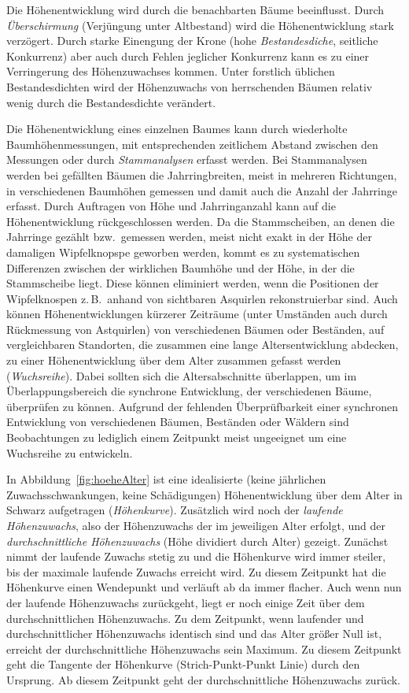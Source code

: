\documentclass[twocolumn]{scrartcl}
\begin{document}
Die Höhenentwicklung wird durch die benachbarten Bäume beeinflusst. Durch
\emph{Überschirmung} (Verjüngung unter Altbestand) wird die Höhenentwicklung
stark verzögert. Durch starke Einengung der Krone (hohe \emph{Bestandesdiche},
seitliche Konkurrenz) aber auch durch Fehlen jeglicher Konkurrenz kann es zu
einer Verringerung des Höhenzuwachses kommen. Unter forstlich üblichen
Bestandesdichten wird der Höhenzuwachs von herrschenden Bäumen relativ wenig
durch die Bestandesdichte verändert.

Die Höhenentwicklung eines einzelnen Baumes kann durch wiederholte
Baumhöhenmessungen, mit entsprechenden zeitlichem Abstand zwischen den Messungen
oder durch \emph{Stammanalysen} erfasst werden. Bei Stammanalysen werden bei
gefällten Bäumen die Jahrringbreiten, meist in mehreren Richtungen, in
verschiedenen Baumhöhen gemessen und damit auch die Anzahl der Jahrringe
erfasst. Durch Auftragen von Höhe und Jahrringanzahl kann auf die
Höhenentwicklung rückgeschlossen werden. Da die Stammscheiben, an denen die
Jahrringe gezählt bzw.\ gemessen werden, meist nicht exakt in der Höhe der
damaligen Wipfelknopspe geworben werden, kommt es zu systematischen Differenzen
zwischen der wirklichen Baumhöhe und der Höhe, in der die Stammscheibe liegt.
Diese können eliminiert werden, wenn die Positionen der Wipfelknospen z.\,B.\
anhand von sichtbaren Asquirlen rekonstruierbar sind. Auch können
Höhenentwicklungen kürzerer Zeiträume (unter Umständen auch durch Rückmessung
von Astquirlen) von verschiedenen Bäumen oder Beständen, auf vergleichbaren
Standorten, die zusammen eine lange Altersentwicklung abdecken, zu einer
Höhenentwicklung über dem Alter zusammen gefasst werden (\emph{Wuchsreihe}).
Dabei sollten sich die Altersabschnitte überlappen, um im Überlappungsbereich
die synchrone Entwicklung, der verschiedenen Bäume, überprüfen zu können.
Aufgrund der fehlenden Überprüfbarkeit einer synchronen Entwicklung von
verschiedenen Bäumen, Beständen oder Wäldern sind Beobachtungen zu lediglich
einem Zeitpunkt meist ungeeignet um eine Wuchsreihe zu entwickeln.

In Abbildung~\ref{fig:hoeheAlter} ist eine idealisierte (keine jährlichen
Zuwachsschwankungen, keine Schädigungen) Höhenentwicklung über dem Alter in
Schwarz aufgetragen (\emph{Höhenkurve}). Zusätzlich wird noch der \emph{laufende
Höhenzuwachs}, also der Höhenzuwachs der im jeweiligen Alter erfolgt, und der
\emph{durchschnittliche Höhenzuwachs} (Höhe dividiert durch Alter) gezeigt.
Zunächst nimmt der laufende Zuwachs stetig zu und die Höhenkurve wird immer
steiler, bis der maximale laufende Zuwachs erreicht wird. Zu diesem Zeitpunkt
hat die Höhenkurve einen Wendepunkt und verläuft ab da immer flacher. Auch wenn
nun der laufende Höhenzuwachs zurückgeht, liegt er noch einige Zeit über dem
durchschnittlichen Höhenzuwachs. Zu dem Zeitpunkt, wenn laufender und
durchschnittlicher Höhenzuwachs identisch sind und das Alter größer Null ist,
erreicht der durchschnittliche Höhenzuwachs sein Maximum. Zu diesem Zeitpunkt
geht die Tangente der Höhenkurve (Strich-Punkt-Punkt Linie) durch den
Ursprung. Ab diesem Zeitpunkt geht der durchschnittliche Höhenzuwachs zurück.
\end{document}
